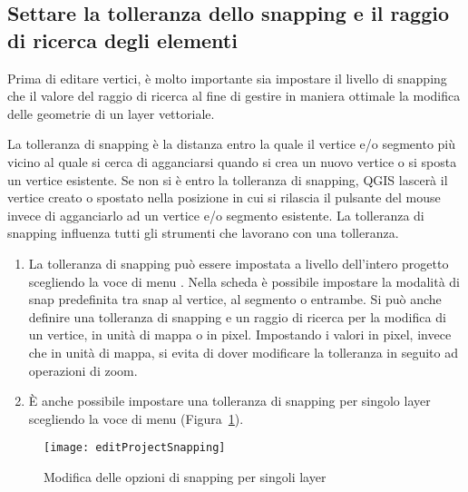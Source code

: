 \subsection{Settare la tolleranza dello snapping e il raggio di ricerca degli elementi}\label{sec:snapping_tolerance}

Prima di editare vertici, è molto importante sia impostare il livello di snapping
che il valore del raggio di ricerca al fine di gestire in maniera ottimale la modifica delle
geometrie di un layer vettoriale. 


La tolleranza di snapping è la distanza entro la quale \qg
{} il vertice e/o segmento più vicino al quale si cerca di
agganciarsi quando si crea un nuovo vertice o si sposta un vertice esistente.
Se non si è entro la tolleranza di snapping, QGIS lascerà il vertice creato o
spostato nella posizione in cui si rilascia il pulsante del mouse invece di
agganciarlo ad un vertice e/o segmento esistente. 
La tolleranza di snapping influenza tutti gli strumenti che lavorano con una tolleranza.

\begin{enumerate}
\item La tolleranza di snapping può essere impostata a livello dell'intero 
progetto scegliendo la voce di menu  \arrow {}.
Nella scheda  è possibile impostare la modalità di
snap predefinita tra snap al vertice, al segmento o entrambe. Si può anche
definire una tolleranza di snapping e un raggio di ricerca per la modifica di
un vertice, in unità di mappa o in pixel. Impostando i valori in pixel, invece 
che in unità di mappa, si evita di dover modificare la tolleranza in seguito 
ad operazioni di zoom. 

\item È anche possibile impostare una tolleranza di snapping per 
singolo layer scegliendo la voce di menu  \arrow
{} (Figura~\ref{fig:snappingoptions}).
\end{enumerate}

\begin{figure}[H]
   \begin{center}
   \caption{Modifica delle opzioni di snapping per singoli layer \wincaption}\label{fig:snappingoptions}\smallskip
   \texttt{[image: editProjectSnapping]} 
\end{center}  
\end{figure}

